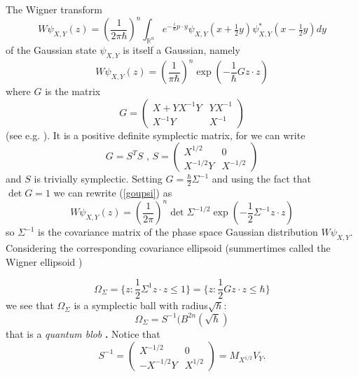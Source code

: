 \documentclass[11pt]{article}%
\begin{document}
The Wigner transform
\begin{equation}
W\psi_{X,Y}(z)=\left(  \frac{1}{2\pi\hbar}\right)  ^{n}\int_{\mathbb{R}^{n}%
}e^{-\frac{i}{\hbar}p\cdot y}\psi_{X,Y}(x+\tfrac{1}{2}y)\psi_{X,Y}^{\ast
}(x-\tfrac{1}{2}y)dy \label{oupsi}%
\end{equation}
of the Gaussian state $\psi_{X,Y}$ is itself a Gaussian, namely%
\begin{equation}
W\psi_{X,Y}(z)=\left(  \frac{1}{\pi\hbar}\right)  ^{n}\exp\left(  -\frac
{1}{\hbar}Gz\cdot z\right)  \label{goupsi}%
\end{equation}
where $G$ is the matrix%
\begin{equation}
G=%
\begin{pmatrix}
X+YX^{-1}Y & YX^{-1}\\
X^{-1}Y & X^{-1}%
\end{pmatrix}
\label{G}%
\end{equation}
(see e.g. \cite{Birk,Littlejohn}). It is a positive definite symplectic
matrix, for we can write
\begin{equation}
G=S^{T}S\text{ \ , \ }S=%
\begin{pmatrix}
X^{1/2} & 0\\
X^{-1/2}Y & X^{-1/2}%
\end{pmatrix}
\label{ess}%
\end{equation}
and $S$ is trivially symplectic. Setting $G=\frac{\hbar}{2}\Sigma^{-1}$ and
using the fact that $\det G=1$ we can rewrite (\ref{goupsi}) as%
\begin{equation}
W\psi_{X,Y}(z)=\left(  \frac{1}{2\pi}\right)  ^{n}\det\Sigma^{-1/2}\exp\left(
-\frac{1}{2}\Sigma^{-1}z\cdot z\right)
\end{equation}
so $\Sigma^{-1}$ is the covariance matrix of the phase space Gaussian
distribution $W\psi_{X,Y}$. Considering the corresponding covariance ellipsoid
(summertimes called the Wigner ellipsoid \cite{Littlejohn})%

\begin{equation}
\Omega_{\Sigma}=\{z:\frac{1}{2}\Sigma^{1}z\cdot z\leq1\}=\{z:\frac{1}%
{2}Gz\cdot z\leq\hbar\} \label{cowig}%
\end{equation}
we see that $\Omega_{\Sigma}$ is a symplectic ball with radius$\sqrt{\hbar}$:%
\begin{equation}
\Omega_{\Sigma}=S^{-1}(B^{2n}(\sqrt{\hbar}) \label{omegablob}%
\end{equation}
that is a \textit{quantum blob} \textbf{\cite{blob}. }Notice that
\begin{equation}
S^{-1}=%
\begin{pmatrix}
X^{-1/2} & 0\\
-X^{-1/2}Y & X^{1/2}%
\end{pmatrix}
=M_{X^{1/2}}V_{Y}. \label{smin1}%
\end{equation}
\end{document}
